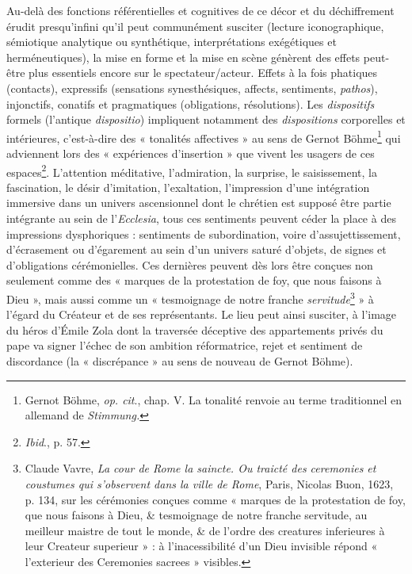 \documentclass[12pt,twoside,openany]{book}
\begin{document}
Au-delà des fonctions référentielles et cognitives de ce décor et du déchiffrement érudit presqu’infini qu’il peut communément susciter (lecture iconographique, sémiotique analytique ou synthétique, interprétations exégétiques et herméneutiques), la mise en forme et la mise en scène génèrent des effets peut-être plus essentiels encore sur le spectateur/acteur. Effets à la fois phatiques (contacts), expressifs (sensations synesthésiques, affects, sentiments, \textit{pathos}), injonctifs, conatifs et pragmatiques (obligations, résolutions). Les \textit{dispositifs} formels (l’antique \textit{dispositio}) impliquent notamment des \textit{dispositions }corporelles et intérieures, c’est-à-dire des « tonalités affectives » au sens de Gernot Böhme\footnote{Gernot Böhme, \textit{op. cit}., chap. V. La tonalité renvoie au terme traditionnel en allemand de \textit{Stimmung.}} qui adviennent lors des « expériences d’insertion » que vivent les usagers de ces espaces\footnote{\textit{Ibid}., p. 57.}. L’attention méditative, l’admiration, la surprise, le saisissement, la fascination, le désir d’imitation, l’exaltation, l’impression d’une intégration immersive dans un univers ascensionnel dont le chrétien est supposé être partie intégrante au sein de l’\textit{Ecclesia}, tous ces sentiments peuvent céder la place à des impressions dysphoriques : sentiments de subordination, voire d’assujettissement, d’écrasement ou d’égarement au sein d’un univers saturé d’objets, de signes et d’obligations cérémonielles. Ces dernières peuvent dès lors être conçues non seulement comme des « marques de la protestation de foy, que nous faisons à Dieu », mais aussi comme un « tesmoignage de notre franche \textit{servitude}\footnote{Claude Vavre, \textit{La cour de Rome la saincte. Ou traicté des ceremonies et coustumes qui s’observent dans la ville de Rome}, Paris, Nicolas Buon, 1623, p. 134, sur les cérémonies conçues comme « marques de la protestation de foy, que nous faisons à Dieu, \& tesmoignage de notre franche servitude, au meilleur maistre de tout le monde, \& de l’ordre des creatures inferieures à leur Createur superieur » : à l’inacessibilité d’un Dieu invisible répond « l’exterieur des Ceremonies sacrees » visibles.} » à l’égard du Créateur et de ses représentants. Le lieu peut ainsi susciter, à l’image du héros d’Émile Zola dont la traversée déceptive des appartements privés du pape va signer l’échec de son ambition réformatrice, rejet et sentiment de discordance (la « discrépance » au sens de nouveau de Gernot Böhme).
\end{document}
